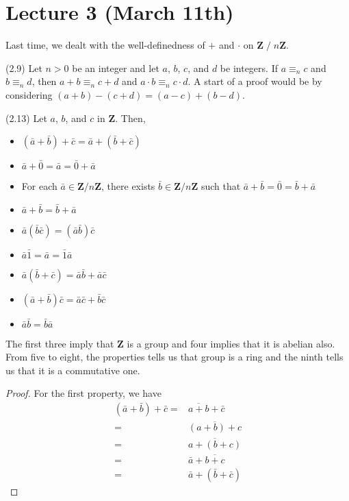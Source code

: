\section{Lecture 3 (March 11th)}
Last time, we dealt with the well-definedness of $+$ and $\cdot $ on ${\bm Z}\;/\;n{\bm Z}$. 
\begin{lem}
	(2.9) Let $n>0$ be an integer and let $a$, $b$, $c$, and $d$ be integers. If $a \equiv_{n} c$ and $b \equiv_{n} d$, then $a+b\equiv_{n} c+d$ and $a\cdot b\equiv_{n}c\cdot d$. A start of a proof would be by considering $(a+b)-(c+d)=(a-c)+(b-d)$.
\end{lem}
\vspace{2ex}
\begin{lem}
(2.13) Let $a$, $b$, and $c$ in ${\bm Z}$. Then,
\begin{itemize}
	\item[1.] $(\bar{a}+\bar{b})+\bar{c}=\bar{a}+(\bar{b}+\bar{c})$
	\item[2.] $\bar{a}+\bar{0}=\bar{a}=\bar{0}+\bar{a}$
	\item[3.] For each $\bar{a}\in {\bm Z}/n{\bm Z}$, there exists $\bar{b}\in {\bm Z}/n{\bm Z}$ such that $\bar{a}+\bar{b}=\bar{0}=\bar{b}+\bar{a}$
	\item[4.] $\bar{a}+\bar{b}=\bar{b}+\bar{a}$
	\item[5.] $\bar{a}(\bar{b}\bar{c})=(\bar{a}\bar{b})\bar{c}$
	\item[6.] $\bar{a}\bar{1}=\bar{a}=\bar{1}\bar{a}$
	\item[7.] $\bar{a}(\bar{b}+\bar{c})=\bar{a}\bar{b}+\bar{a}\bar{c}$
	\item[8.] $(\bar{a}+\bar{b})\bar{c}=\bar{a}\bar{c}+\bar{b}\bar{c}$
	\item[9.] $\bar{a}\bar{b}=\bar{b}\bar{a}$
\end{itemize}
The first three imply that ${\bm Z}$ is a group and four implies that it is abelian also. From five to eight, the properties tells us that group is a ring and the ninth tells us that it is a commutative one. 
\end{lem}
\vspace{2ex}
\begin{proof}
For the first property, we have
\begin{align*}
	(\bar{a}+\bar{b})+\bar{c}=&\overline{a+b}+\bar{c}\\
	=&\overline{(a+b)+c}\\
	=&\overline{a+(b+c)}\\
	=&\bar{a}+\overline{b+c}\\
	=&\bar{a}+(\bar{b}+\bar{c})
\end{align*}
\end{proof}
